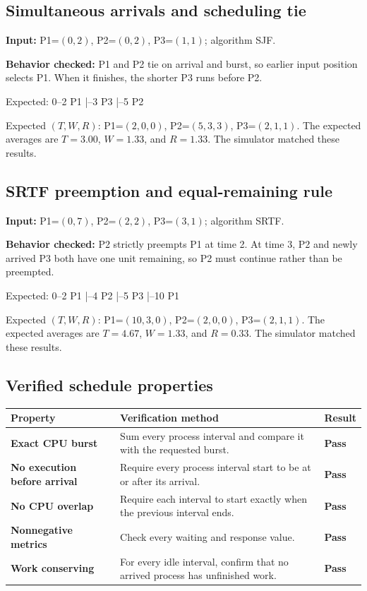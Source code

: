 \documentclass[11pt,a4paper]{article}
\newcommand{\timeline}[1]{%
  \begin{center}
  \colorbox{softgray}{\parbox{0.94\linewidth}{\ttfamily\small #1}}
  \end{center}
}
\begin{document}
\subsection{Simultaneous arrivals and scheduling tie}

\textbf{Input:} P1=$(0,2)$, P2=$(0,2)$, P3=$(1,1)$; algorithm SJF.

\textbf{Behavior checked:} P1 and P2 tie on arrival and burst, so earlier input
position selects P1. When it finishes, the shorter P3 runs before P2.

\timeline{Expected: 0--2 P1 \;|--3 P3 \;|--5 P2}

Expected $(T,W,R)$: P1=$(2,0,0)$, P2=$(5,3,3)$, P3=$(2,1,1)$. The expected
averages are $T=3.00$, $W=1.33$, and $R=1.33$. The simulator matched these results.

\subsection{SRTF preemption and equal-remaining rule}

\textbf{Input:} P1=$(0,7)$, P2=$(2,2)$, P3=$(3,1)$; algorithm SRTF.

\textbf{Behavior checked:} P2 strictly preempts P1 at time 2. At time 3, P2 and
newly arrived P3 both have one unit remaining, so P2 must continue rather than be
preempted.

\timeline{Expected: 0--2 P1 \;|--4 P2 \;|--5 P3 \;|--10 P1}

Expected $(T,W,R)$: P1=$(10,3,0)$, P2=$(2,0,0)$, P3=$(2,1,1)$. The expected
averages are $T=4.67$, $W=1.33$, and $R=0.33$. The simulator matched these results.

\subsection{Verified schedule properties}

\begin{table}[H]
  \centering\small
  \begin{tabularx}{\linewidth}{>{\bfseries}lX>{\color{success}\bfseries}l}
    \toprule
    Property                    & Verification method                                                           & Result \\
    \midrule
    Exact CPU burst             & Sum every process interval and compare it with the requested burst.           & Pass   \\
    No execution before arrival & Require every process interval start to be at or after its arrival.           & Pass   \\
    No CPU overlap              & Require each interval to start exactly when the previous interval ends.       & Pass   \\
    Nonnegative metrics         & Check every waiting and response value.                                       & Pass   \\
    Work conserving             & For every idle interval, confirm that no arrived process has unfinished work. & Pass   \\
    \bottomrule
  \end{tabularx}
\end{table}
\end{document}
